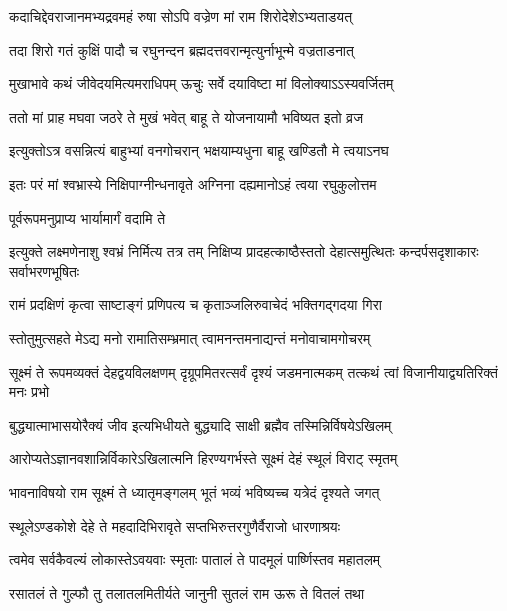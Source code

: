 \twolineshloka
{कदाचिद्देवराजानमभ्यद्रवमहं रुषा}
{सोऽपि वज्रेण मां राम शिरोदेशेऽभ्यताडयत्} %

\twolineshloka
{तदा शिरो गतं कुक्षिं पादौ च रघुनन्दन}
{ब्रह्मदत्तवरान्मृत्युर्नाभून्मे वज्रताडनात्} %

\twolineshloka
{मुखाभावे कथं जीवेदयमित्यमराधिपम्}
{ऊचुः सर्वे दयाविष्टा मां विलोक्याऽऽस्यवर्जितम्} %

\twolineshloka
{ततो मां प्राह मघवा जठरे ते मुखं भवेत्}
{बाहू ते योजनायामौ भविष्यत इतो व्रज} %

\twolineshloka
{इत्युक्तोऽत्र वसन्नित्यं बाहुभ्यां वनगोचरान्}
{भक्षयाम्यधुना बाहू खण्डितौ मे त्वयाऽनघ} %

\twolineshloka
{इतः परं मां श्वभ्रास्ये निक्षिपाग्नीन्धनावृते}
{अग्निना दह्यमानोऽहं त्वया रघुकुलोत्तम} %

\onelineshloka
{पूर्वरूपमनुप्राप्य भार्यामार्गं वदामि ते} %


\threelineshloka
{इत्युक्ते लक्ष्मणेनाशु श्वभ्रं निर्मित्य तत्र तम्}
{निक्षिप्य प्रादहत्काष्ठैस्ततो देहात्समुत्थितः}
{कन्दर्पसदृशाकारः सर्वाभरणभूषितः} %

\twolineshloka
{रामं प्रदक्षिणं कृत्वा साष्टाङ्गं प्रणिपत्य च}
{कृताञ्जलिरुवाचेदं भक्तिगद्गदया गिरा} %


\twolineshloka
{स्तोतुमुत्सहते मेऽद्य मनो रामातिसम्भ्रमात्}
{त्वामनन्तमनाद्यन्तं मनोवाचामगोचरम्} %

\threelineshloka
{सूक्ष्मं ते रूपमव्यक्तं देहद्वयविलक्षणम्}
{दृग्रूपमितरत्सर्वं दृश्यं जडमनात्मकम्}
{तत्कथं त्वां विजानीयाद्व्यतिरिक्तं मनः प्रभो} %

\twolineshloka
{बुद्ध्यात्माभासयोरैक्यं जीव इत्यभिधीयते}
{बुद्ध्यादि साक्षी ब्रह्मैव तस्मिन्निर्विषयेऽखिलम्} %

\twolineshloka
{आरोप्यतेऽज्ञानवशान्निर्विकारेऽखिलात्मनि}
{हिरण्यगर्भस्ते सूक्ष्मं देहं स्थूलं विराट् स्मृतम्} %

\twolineshloka
{भावनाविषयो राम सूक्ष्मं ते ध्यातृमङ्गलम्}
{भूतं भव्यं भविष्यच्च यत्रेदं दृश्यते जगत्} %

\twolineshloka
{स्थूलेऽण्डकोशे देहे ते महदादिभिरावृते}
{सप्तभिरुत्तरगुणैर्वैराजो धारणाश्रयः} %

\twolineshloka
{त्वमेव सर्वकैवल्यं लोकास्तेऽवयवाः स्मृताः}
{पातालं ते पादमूलं पार्ष्णिस्तव महातलम्} %

\twolineshloka
{रसातलं ते गुल्फौ तु तलातलमितीर्यते}
{जानुनी सुतलं राम ऊरू ते वितलं तथा} %

